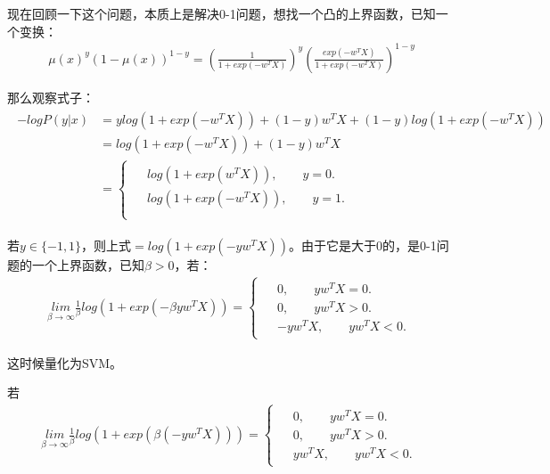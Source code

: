 \documentclass[12pt,UTF8,AutoFakeBold]{article}
\begin{document}
现在回顾一下这个问题，本质上是解决0-1问题，想找一个凸的上界函数，已知一个变换：
\begin{gather}
\mu { (x) }^{ y }{ (1-\mu (x)) }^{ 1-y }={ (\frac { 1 }{ 1+exp(-{ w }^{ T }X) } ) }^{ y }{ (\frac { exp(-{ w }^{ T }X) }{ 1+exp(-{ w }^{ T }X) } ) }^{ 1-y }
\end{gather}

那么观察式子：
\begin{gather}
\begin{aligned}
-logP(y|x) & =ylog(1+exp(-{ w }^{ T }X))+(1-y){ w }^{ T }X+(1-y)log(1+exp(-{ w }^{ T }X))\\
& =log(1+exp(-{ w }^{ T }X))+(1-y){ w }^{ T }X\\
& =\left\{
\begin{aligned}
             \begin{aligned}  
             &log(1+exp({ w }^{ T }X)),\quad \quad y=0.  \\  
             &log(1+exp(-{ w }^{ T }X)),\quad \quad y=1.\\  
             \end{aligned}  
\end{aligned}
\right.
\end{aligned}
\end{gather}

若$y\in \{-1,1\}$，则上式$=log(1+exp(-y{ w }^{ T }X))$。由于它是大于0的，是0-1问题的一个上界函数，已知$\beta >0$，若：
\begin{gather}
\underset { \beta \rightarrow \infty  }{ lim } \frac { 1 }{ \beta  } log(1+exp(-\beta y{ w }^{ T }X))=\left\{
\begin{aligned}
             \begin{aligned}  
             &0,\quad \quad yw^TX=0.  \\  
             &0,\quad \quad yw^TX>0.\\ 
             &-yw^TX,\quad \quad yw^TX<0.
             \end{aligned}  
\end{aligned}
\right.
\end{gather}

这时候量化为SVM。

若\begin{gather}
\underset { \beta \rightarrow \infty  }{ lim } \frac { 1 }{ \beta  } log(1+exp(\beta(- y{ w }^{ T }X)))=\left\{
\begin{aligned}
             \begin{aligned}  
             &0,\quad \quad yw^TX=0.  \\  
             &0,\quad \quad yw^TX>0.\\ 
             &yw^TX,\quad \quad yw^TX<0.
             \end{aligned}  
\end{aligned}
\right.
\end{gather}
\end{document}
